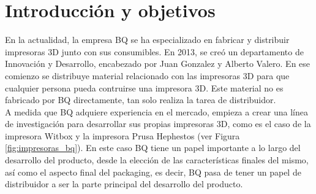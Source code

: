 \chapter{Introducción y objetivos}
\label{cap:introduccion}

En la actualidad, la empresa BQ se ha especializado en fabricar y distribuir impresoras 3D junto con sus consumibles. En 2013, se creó un departamento de Innovación y Desarrollo, encabezado por Juan Gonzalez y Alberto Valero. En ese comienzo se distribuye material relacionado con las impresoras 3D para que cualquier persona pueda contruirse una impresora 3D. Este material no es fabricado por BQ directamente, tan solo realiza la tarea de distribuidor.\\

A medida que BQ adquiere experiencia en el mercado, empieza a crear una línea de investigación para desarrollar sus propias impresoras 3D, como es el caso de la impresora Witbox y la impresora Prusa Hephestos (ver Figura \ref{fig:impresoras_bq}). En este caso BQ tiene un papel importante a lo largo del desarrollo del producto, desde la elección de las características finales del mismo, así como el aspecto final del packaging, es decir, BQ pasa de tener un papel de distribuidor a ser la parte principal del desarrollo del producto.

